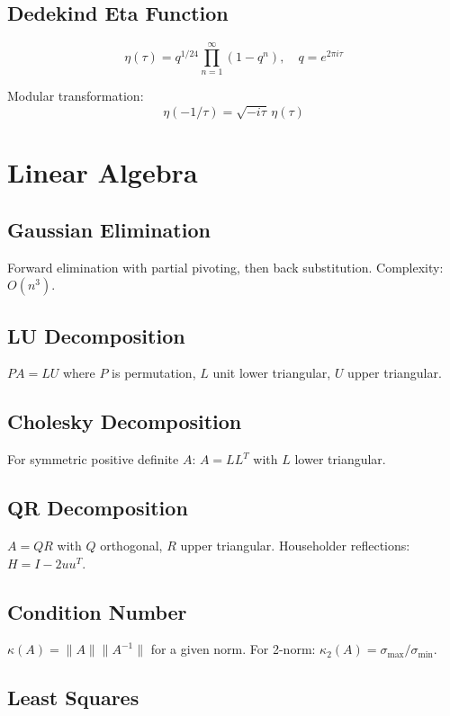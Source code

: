 \subsection{Dedekind Eta Function}

\[
\eta(\tau) = q^{1/24} \prod_{n=1}^{\infty} (1 - q^n), \quad q = e^{2\pi i \tau}
\]

Modular transformation:
\[
\eta(-1/\tau) = \sqrt{-i\tau}\, \eta(\tau)
\]

\section{Linear Algebra}

\subsection{Gaussian Elimination}

Forward elimination with partial pivoting, then back substitution.
Complexity: $O(n^3)$.

\subsection{LU Decomposition}

$PA = LU$ where $P$ is permutation, $L$ unit lower triangular, $U$ upper triangular.

\subsection{Cholesky Decomposition}

For symmetric positive definite $A$: $A = LL^T$ with $L$ lower triangular.

\subsection{QR Decomposition}

$A = QR$ with $Q$ orthogonal, $R$ upper triangular.
Householder reflections: $H = I - 2uu^T$.

\subsection{Condition Number}

$\kappa(A) = \|A\| \|A^{-1}\|$ for a given norm.
For 2-norm: $\kappa_2(A) = \sigma_{\max}/\sigma_{\min}$.

\subsection{Least Squares}

